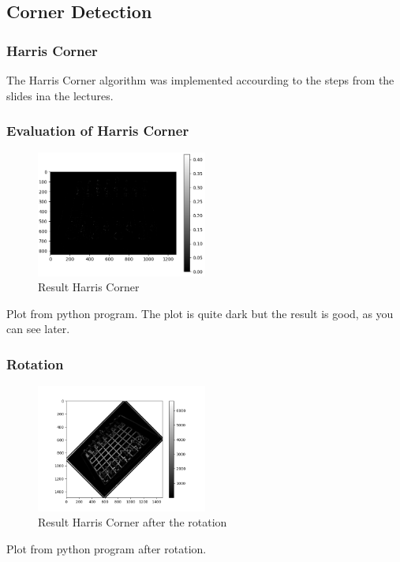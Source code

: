 \documentclass[12pt]{article}
\begin{document}
\newpage
\subsection{Corner Detection}

\subsubsection{Harris Corner}
The Harris Corner algorithm was implemented accourding to the steps from the slides ina
the lectures.
\subsubsection{Evaluation of Harris Corner}
\begin{figure}[!htb]
  \centering
  \includegraphics[width=0.5\textwidth]{pics/3_2_s}
  \caption{Result Harris Corner}
\end{figure}
Plot from python program. The plot is quite dark but the result is good, as you can see later.

\subsubsection{Rotation}
\begin{figure}[!htb]
  \centering
  \includegraphics[width=0.5\textwidth]{pics/3_3_s}
  \caption{Result Harris Corner after the rotation}
\end{figure}
Plot from python program after rotation.

\newpage
\end{document}
